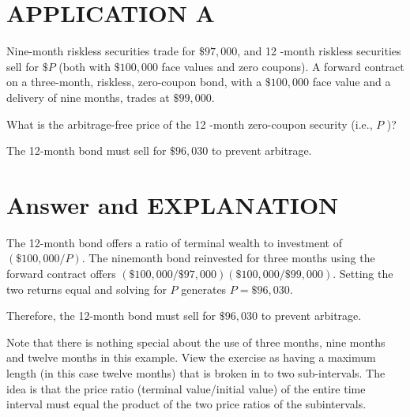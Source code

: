 \documentclass[11pt]{article}
\begin{document}
\section*{APPLICATION A}
Nine-month riskless securities trade for $\$ 97,000$, and 12 -month riskless securities sell for $\$ P$ (both with $\$ 100,000$ face values and zero coupons). A forward contract on a three-month, riskless, zero-coupon bond, with a $\$ 100,000$ face value and a delivery of nine months, trades at $\$ 99,000$.

What is the arbitrage-free price of the 12 -month zero-coupon security (i.e., $P$ )?

The 12-month bond must sell for $\$ 96,030$ to prevent arbitrage.

\section*{Answer and EXPLANATION}
The 12-month bond offers a ratio of terminal wealth to investment of $(\$ 100,000 / P)$. The ninemonth bond reinvested for three months using the forward contract offers $(\$ 100,000 / \$ 97,000)(\$ 100,000 / \$ 99,000)$. Setting the two returns equal and solving for $P$ generates $P=\$ 96,030$.

Therefore, the 12-month bond must sell for $\$ 96,030$ to prevent arbitrage.

Note that there is nothing special about the use of three months, nine months and twelve months in this example. View the exercise as having a maximum length (in this case twelve months) that is broken in to two sub-intervals. The idea is that the price ratio (terminal value/initial value) of the entire time interval must equal the product of the two price ratios of the subintervals.
\end{document}

